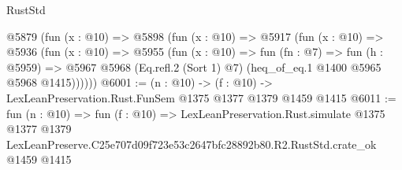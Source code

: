 \begin{lexlean}{RustStd}
\begin{coremodule}
  @5879
    (fun (x : @10) =>
    @5898
      (fun (x : @10) =>
      @5917
        (fun (x : @10) =>
        @5936
          (fun (x : @10) =>
          @5955
            (fun (x : @10) =>
            fun (fn : @7) =>
            fun (h : @5959) =>
            @5967 @5968 (Eq.refl.{2} (Sort 1) @7) (heq_of_eq.{1} @1400 @5965 @5968 @1415))))))
@6001 := (n : @10) -> (f : @10) -> LexLeanPreservation.Rust.FunSem @1375 @1377 @1379 @1459 @1415
@6011 := fun (n : @10) =>
  fun (f : @10) =>
  LexLeanPreservation.Rust.simulate
    @1375
    @1377
    @1379
    LexLeanPreserve.C25e707d09f723e53c2647bfc28892b80.R2.RustStd.crate_ok
    @1459
    @1415
\end{coremodule}
\end{lexlean}
